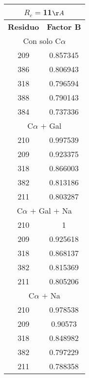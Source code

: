\begin{tabular}[c]{|c|c|}
\multicolumn{2}{c}{$R_c=$11$\AA$}\\\hline
\textbf{Residuo}&\textbf{Factor B}\\\hline
\multicolumn{2}{c}{Con solo C$\alpha$}\\\hline
       209&  0.857345\\
       386&  0.806943\\
       318&  0.796594\\
       388&  0.790143\\
       384&  0.737336\\
\hline
\multicolumn{2}{c}{C$\alpha$ $+$ Gal}\\\hline
       210&  0.997539\\
       209&  0.923375\\
       318&  0.866003\\
       382&  0.813186\\
       211&  0.803287\\
\hline
\multicolumn{2}{c}{C$\alpha$ $+$ Gal $+$ Na}\\\hline
       210&         1\\
       209&  0.925618\\
       318&  0.868137\\
       382&  0.815369\\
       211&  0.805206\\
\hline
\multicolumn{2}{c}{C$\alpha$ $+$ Na}\\\hline
       210&  0.978538\\
       209&   0.90573\\
       318&  0.848982\\
       382&  0.797229\\
       211&  0.788358\\
\hline
\end{tabular}
